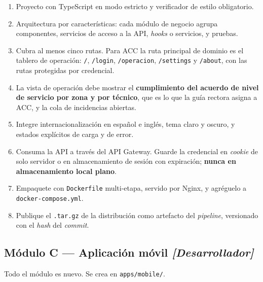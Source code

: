\documentclass[11pt,a4paper]{article}
\begin{document}
\begin{enumerate}[leftmargin=*,itemsep=3pt]
	\item Proyecto con TypeScript en modo estricto y verificador de estilo obligatorio.
	\item Arquitectura por características: cada módulo de negocio agrupa componentes, servicios de acceso a la API, \emph{hooks} o servicios, y pruebas.
	\item Cubra al menos cinco rutas. Para ACC la ruta principal de dominio es el tablero de operación: \texttt{/}, \texttt{/login}, \texttt{/operacion}, \texttt{/settings} y \texttt{/about}, con las rutas protegidas por credencial.
	\item La vista de operación debe mostrar el \textbf{cumplimiento del acuerdo de nivel de servicio por zona y por técnico}, que es lo que la guía rectora asigna a ACC, y la cola de incidencias abiertas.
	\item Integre internacionalización en español e inglés, tema claro y oscuro, y estados explícitos de carga y de error.
	\item Consuma la API a través del API Gateway. Guarde la credencial en \emph{cookie} de solo servidor o en almacenamiento de sesión con expiración; \textbf{nunca en almacenamiento local plano}.
	\item Empaquete con \texttt{Dockerfile} multi-etapa, servido por Nginx, y agréguelo a \texttt{docker-compose.yml}.
	\item Publique el \texttt{.tar.gz} de la distribución como artefacto del \emph{pipeline}, versionado con el \emph{hash} del \emph{commit}.
\end{enumerate}

\subsection{Módulo C --- Aplicación móvil \emph{[Desarrollador]}}

Todo el módulo es nuevo. Se crea en \texttt{apps/mobile/}.
\end{document}
